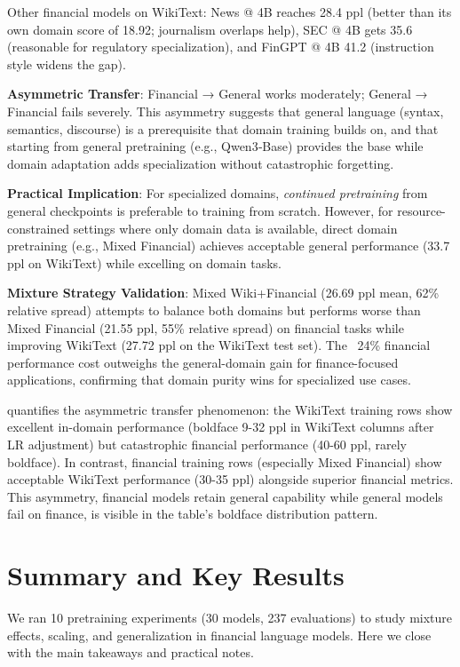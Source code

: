 Other financial models on WikiText: News @ 4B reaches 28.4 ppl (better than its own domain score of 18.92; journalism overlaps help), SEC @ 4B gets 35.6 (reasonable for regulatory specialization), and FinGPT @ 4B 41.2 (instruction style widens the gap).

\textbf{Asymmetric Transfer}: Financial → General works moderately; General → Financial fails severely. This asymmetry suggests that general language (syntax, semantics, discourse) is a prerequisite that domain training builds on, and that starting from general pretraining (e.g., Qwen3‑Base) provides the base while domain adaptation adds specialization without catastrophic forgetting.

\textbf{Practical Implication}: For specialized domains, \textit{continued pretraining} from general checkpoints is preferable to training from scratch. However, for resource-constrained settings where only domain data is available, direct domain pretraining (e.g., Mixed Financial) achieves acceptable general performance (33.7 ppl on WikiText) while excelling on domain tasks.

\textbf{Mixture Strategy Validation}: Mixed Wiki+Financial (26.69 ppl mean, 62\% relative spread) attempts to balance both domains but performs worse than Mixed Financial (21.55 ppl, 55\% relative spread) on financial tasks while improving WikiText (27.72 ppl on the WikiText test set). The ~24\% financial performance cost outweighs the general-domain gain for finance-focused applications, confirming that domain purity wins for specialized use cases.



 quantifies the asymmetric transfer phenomenon: the WikiText training rows show excellent in-domain performance (boldface 9-32 ppl in WikiText columns after LR adjustment) but catastrophic financial performance (40-60 ppl, rarely boldface). In contrast, financial training rows (especially Mixed Financial) show acceptable WikiText performance (30-35 ppl) alongside superior financial metrics. This asymmetry, financial models retain general capability while general models fail on finance, is visible in the table's boldface distribution pattern.

\section{Summary and Key Results}

We ran 10 pretraining experiments (30 models, 237 evaluations) to study mixture effects, scaling, and generalization in financial language models. Here we close with the main takeaways and practical notes.

